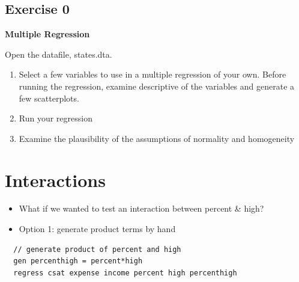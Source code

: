 \documentclass[]{book}
\providecommand{\tightlist}{%
  \setlength{\itemsep}{0pt}\setlength{\parskip}{0pt}}
\begin{document}
\hypertarget{exercise-0-7}{%
\subsection{Exercise 0}\label{exercise-0-7}}

\textbf{Multiple Regression}

Open the datafile, states.dta.

\begin{enumerate}
\def\labelenumi{\arabic{enumi}.}
\tightlist
\item
  Select a few variables to use in a multiple regression of your own. Before running the regression, examine descriptive of the variables and generate a few scatterplots.
\item
  Run your regression
\item
  Examine the plausibility of the assumptions of normality and homogeneity
\end{enumerate}

\hypertarget{interactions}{%
\section{Interactions}\label{interactions}}

\begin{itemize}
\tightlist
\item
  What if we wanted to test an interaction between percent \& high?
\item
  Option 1: generate product terms by hand
\end{itemize}

\begin{verbatim}
  // generate product of percent and high
  gen percenthigh = percent*high 
  regress csat expense income percent high percenthigh
\end{verbatim}
\end{document}
